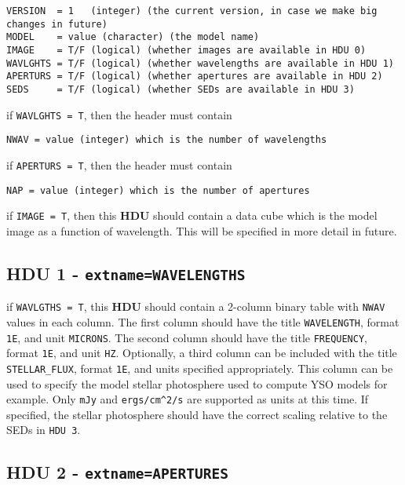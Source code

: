 \documentclass[11pt]{article}
\begin{document}
\begin{verbatim}
VERSION  = 1   (integer) (the current version, in case we make big changes in future)
MODEL    = value (character) (the model name)
IMAGE    = T/F (logical) (whether images are available in HDU 0)
WAVLGHTS = T/F (logical) (whether wavelengths are available in HDU 1)
APERTURS = T/F (logical) (whether apertures are available in HDU 2)
SEDS     = T/F (logical) (whether SEDs are available in HDU 3)
\end{verbatim}

if \texttt{WAVLGHTS = T}, then the header must contain

\begin{verbatim}
NWAV = value (integer) which is the number of wavelengths
\end{verbatim}

if \texttt{APERTURS = T}, then the header must contain

\begin{verbatim}
NAP = value (integer) which is the number of apertures
\end{verbatim}

if \texttt{IMAGE = T}, then this \textbf{HDU} should contain a data cube which is the
model image as a function of wavelength. This will be specified in more detail in future.

\subsection{HDU 1 - \texttt{extname=WAVELENGTHS}}

if \texttt{WAVLGTHS = T}, this \textbf{HDU} should contain a 2-column binary table with \texttt{NWAV}
values in each column. The first column should have the title \texttt{WAVELENGTH}, format \texttt{1E}, and unit \texttt{MICRONS}. The second column should have the title \texttt{FREQUENCY}, format \texttt{1E}, and unit \texttt{HZ}. Optionally, a third column can be included with the title \texttt{STELLAR\_FLUX}, format \texttt{1E}, and units specified appropriately. This column can be used to specify the model stellar photosphere used to compute YSO models for example. Only \texttt{mJy} and \texttt{ergs/cm\^{}2/s} are supported as units at this time. If specified, the stellar photosphere should have the correct scaling relative to the SEDs in \texttt{HDU 3}.


\subsection{HDU 2 - \texttt{extname=APERTURES}}
\end{document}

